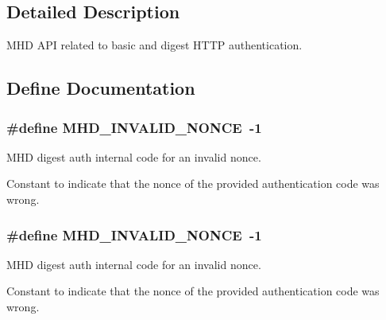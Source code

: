 \subsection{\-Detailed \-Description}
\-M\-H\-D \-A\-P\-I related to basic and digest \-H\-T\-T\-P authentication. 

\subsection{\-Define \-Documentation}
\hypertarget{group__authentication_gac8deda2486d44f93a9b3c39d16ba8886}{
\subsubsection[{\-M\-H\-D\-\_\-\-I\-N\-V\-A\-L\-I\-D\-\_\-\-N\-O\-N\-C\-E}]{\setlength{\rightskip}{0pt plus 5cm}\#define {\bf \-M\-H\-D\-\_\-\-I\-N\-V\-A\-L\-I\-D\-\_\-\-N\-O\-N\-C\-E}~-\/1}}\label{group__authentication_gac8deda2486d44f93a9b3c39d16ba8886}
\-M\-H\-D digest auth internal code for an invalid nonce.

\-Constant to indicate that the nonce of the provided authentication code was wrong. \hypertarget{group__authentication_gac8deda2486d44f93a9b3c39d16ba8886}{
\subsubsection[{\-M\-H\-D\-\_\-\-I\-N\-V\-A\-L\-I\-D\-\_\-\-N\-O\-N\-C\-E}]{\setlength{\rightskip}{0pt plus 5cm}\#define {\bf \-M\-H\-D\-\_\-\-I\-N\-V\-A\-L\-I\-D\-\_\-\-N\-O\-N\-C\-E}~-\/1}}\label{group__authentication_gac8deda2486d44f93a9b3c39d16ba8886}
\-M\-H\-D digest auth internal code for an invalid nonce.

\-Constant to indicate that the nonce of the provided authentication code was wrong. 

